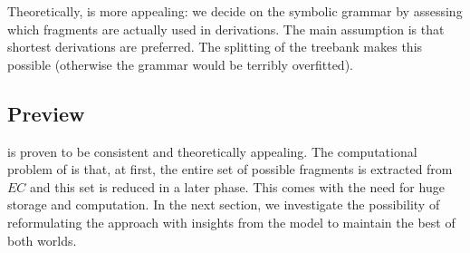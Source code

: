 Theoretically,\dops{} is more appealing: we decide on the symbolic grammar by assessing which fragments are actually used in derivations. The main assumption is that shortest derivations are preferred. The splitting of the treebank makes this possible (otherwise the grammar would be terribly overfitted).



\subsection{Preview}
\dops{} is proven to be consistent and theoretically appealing. The computational problem of \dops{} is that, at first, the entire set of possible fragments is extracted from $EC$ and this set is reduced in a later phase. This comes with the need for huge storage and computation. In the next section, we investigate the possibility of reformulating the \dops{} approach with insights from the \ddop{} model to maintain the best of both worlds. 






























